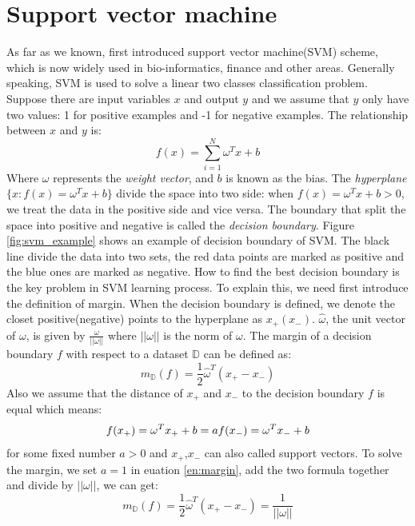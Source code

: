 \section{Support vector machine}
As far as we known, \cite{boser1992training} first introduced support vector machine(SVM) scheme, which is now widely used in bio-informatics, finance and other areas. Generally speaking, SVM is used to solve a linear two classes classification problem. Suppose there are input variables $x$ and output $y$ and we assume that $y$ only have two values: 1 for positive examples and -1 for negative examples. The relationship between $x$ and $y$ is:
\begin{equation}
f(x)=\sum_{i=1}^{N}\omega^T x +b
\end{equation} 
Where $\omega$ represents the \textit{weight vector}, and $b$ is known as the bias. The \textit{hyperplane} $\{x:f(x)=\omega^Tx+b\}$ divide the space into two side: when $f(x)=\omega^Tx+b>0$, we treat the data in the positive side and vice versa. The boundary that split the space into positive and negative is called the \textit{decision boundary}. Figure \ref{fig:svm_example} shows an example of decision boundary of SVM. The black line divide the data into two sets, the red data points are marked as positive and the blue ones are marked as negative. How to find the best decision boundary is the key problem in SVM learning process. To explain this, we need first introduce the definition of margin. When the decision boundary is defined, we denote the closet positive(negative) points to the hyperplane as $x_+(x_-)$. $\hat{\omega}$, the unit vector of $\omega$, is given by $\frac{\omega}{||\omega||}$ where $||\omega||$ is the norm of $\omega$. The margin of a decision boundary $f$ with respect to a dataset $\mathbb{D}$ can be defined as:
\begin{equation}
m_\mathbb{D}(f)=\frac{1}{2}\hat{\omega}^T(x_+-x_-)
\end{equation} 
Also we assume that the distance of $x_+$ and $x_-$ to the decision boundary $f$ is equal which means:
\begin{equation}\label{en:margin}
f(x_+)=\omega^Tx_++b=a\\
f(x_-)=\omega^Tx_-+b
\end{equation}
for some fixed number $a>0$ and $x_+$,$x_-$ can also called support vectors. To solve the margin, we set $a=1$ in euation \ref{en:margin}, add the two formula together and divide by $||\omega||$, we can get:
\begin{equation}
	m_\mathbb{D}(f)=\frac{1}{2}\hat{\omega}^T(x_+-x_-)=\frac{1}{||\omega||}
\end{equation}	


